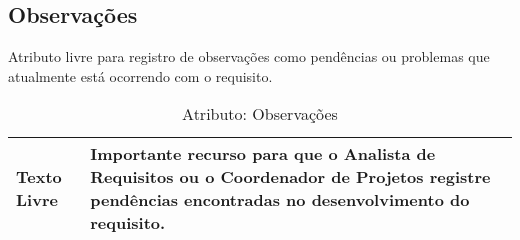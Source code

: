 \subsection{Observações}
  Atributo livre para registro de observações como pendências ou problemas que atualmente está ocorrendo com o requisito.
\begin{table}[H]
  \centering
    \begin{tabular}{| m{5em} | m{10cm} |}
      \hline
      Texto Livre     & Importante recurso   para que o Analista de Requisitos ou o Coordenador de Projetos registre   pendências encontradas no desenvolvimento do requisito.   \\ \hline
    \end{tabular}
    \caption{Atributo: Observações }
    \label{tabela:atributo_estabilidade}
\end{table}
